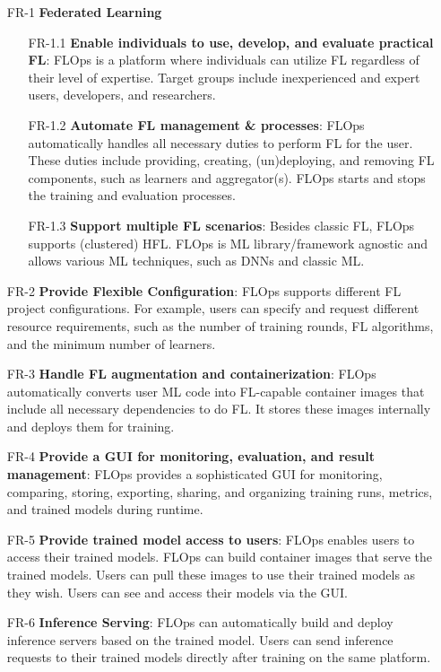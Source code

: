 \begin{itemize}
    \item [FR-1] {\textbf{Federated Learning}}
        \begin{itemize}
        \item [FR-1.1] \textbf{Enable individuals to use, develop, and evaluate practical FL}:
            FLOps is a platform where individuals can utilize FL regardless of their level of expertise.
            Target groups include inexperienced and expert users, developers, and researchers.
        \item [FR-1.2] \textbf{Automate FL management \& processes}:
            FLOps automatically handles all necessary duties to perform FL for the user.
            These duties include providing, creating, (un)deploying, and removing FL components, such as learners and aggregator(s).
            FLOps starts and stops the training and evaluation processes.
        \item [FR-1.3] \textbf{Support multiple FL scenarios}:
            Besides classic FL, FLOps supports (clustered) HFL.
            FLOps is ML library/framework agnostic and allows various ML techniques, such as DNNs and classic ML.
        \end{itemize}
    \item [FR-2] {\textbf{Provide Flexible Configuration}}:
        FLOps supports different FL project configurations.
        For example, users can specify and request different resource requirements, such as the number of training rounds, FL algorithms, and the minimum number of learners.
    \item [FR-3] {\textbf{Handle FL augmentation and containerization}}:
        FLOps automatically converts user ML code into FL-capable container images that include all necessary dependencies to do FL.
        It stores these  images internally and deploys them for training.
    \item [FR-4] {\textbf{Provide a GUI for monitoring, evaluation, and result management}}:
        FLOps provides a sophisticated GUI for monitoring, comparing, storing, exporting, sharing, and organizing training runs, metrics, and trained models during runtime.
    \item [FR-5] {\textbf{Provide trained model access to users}}:
        FLOps enables users to access their trained models.
        FLOps can build container images that serve the trained models.
        Users can pull these images to use their trained models as they wish.
        Users can see and access their models via the GUI.
    \item [FR-6] {\textbf{Inference Serving}}:
        FLOps can automatically build and deploy inference servers based on the trained model.
        Users can send inference requests to their trained models directly after training on the same platform.
\end{itemize}

